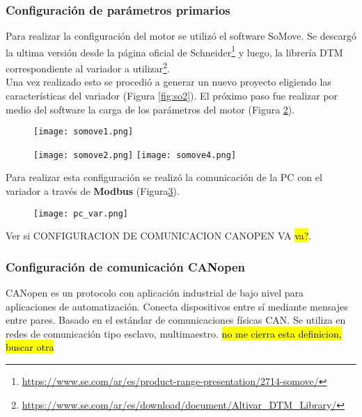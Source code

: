 \subsubsection{Configuración de parámetros primarios}
Para realizar la configuración del motor se utilizó el software SoMove. Se descargó la ultima versión desde la página oficial de Schneider\footnote{\url{https://www.se.com/ar/es/product-range-presentation/2714-somove/}} y luego, la librería DTM correspondiente al variador a utilizar\footnote{\url{https://www.se.com/ar/es/download/document/Altivar_DTM_Library/}}.
\\
Una vez realizado esto se procedió a generar un nuevo proyecto eligiendo las características del variador (Figura \ref{fig:so2}). El próximo paso fue realizar por medio del software la carga de los parámetros del motor (Figura \ref{fig:so4}).
\begin{figure}[h]
	\centering
	\texttt{[image: somove1.png]}
	\label{fig:so1}
\end{figure}
\begin{figure}[h]
	\centering
	\texttt{[image: somove2.png]}
	\label{fig:so2}
	\texttt{[image: somove4.png]}
	\label{fig:so4}
\end{figure}

Para realizar esta configuración se realizó la comunicación de la PC con el variador a través de \textbf{Modbus} (Figura\ref{fig:pcvar}).  
\begin{figure}[h]
	\centering
	\texttt{[image: pc\_var.png]}
	\label{fig:pcvar}
\end{figure}

Ver si CONFIGURACION DE COMUNICACION CANOPEN VA \hl{va?}.

\subsubsection{Configuración de comunicación CANopen}

\begin{tcolorbox}[colback=blue!5!white,colframe=blue!75!black,title=CANopen]
	CANopen es un protocolo con aplicación industrial de bajo nivel para aplicaciones de automatización. Conecta dispositivos entre sí mediante mensajes entre pares. Basado en el estándar de comunicaciones físicas CAN. Se utiliza en redes de comunicación tipo esclavo, multimaestro. \hl{no me cierra esta definicion, buscar otra}
\end{tcolorbox}

